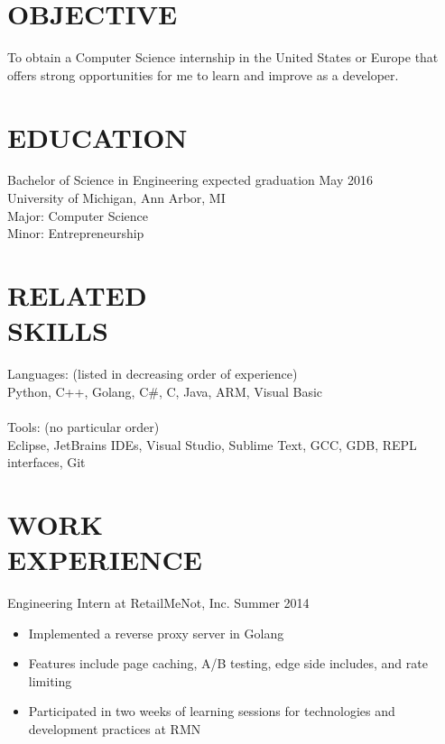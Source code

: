 \documentclass[line,margin]{res}
\begin{document}

\color{HeaderColor}
\address{ajlj@umich.edu -- 248-716-5054}
\address{Citizen of the United States and Italy}
 
 \renewcommand{\labelitemi}{$-$}
 
\begin{resume}
\color{black}
\section{\textcolor{HeaderColor}{OBJECTIVE}}
				To obtain a Computer Science internship in the United States or Europe that offers strong opportunities for me to learn and improve as a developer.

\section{\textcolor{HeaderColor}{EDUCATION}} {\sc Bachelor of Science in Engineering} \hfill expected graduation May 2016\\
				University of Michigan, Ann Arbor, MI \\
                Major: Computer Science \\
                Minor: Entrepreneurship
 
\section{\textcolor{HeaderColor}{RELATED \\ SKILLS}} 
				{\sc Languages: (listed in decreasing order of experience)} \\
				Python, C++, Golang, C\#, C, Java, ARM, Visual Basic \\ \\
                {\sc Tools: (no particular order)} \\
                Eclipse, JetBrains IDEs, Visual Studio, Sublime Text, GCC, GDB, REPL interfaces, Git
 
\section{\textcolor{HeaderColor}{WORK \\ EXPERIENCE}} 
                {\sc Engineering Intern at RetailMeNot, Inc.} \hfill Summer 2014
                 \begin{itemize}  \itemsep -2pt %
                 \item Implemented a reverse proxy server in Golang
                 \item Features include page caching, A/B testing, edge side includes, and rate limiting
                 \item Participated in two weeks of learning sessions for technologies and development practices at RMN
                 \end{itemize}


\end{resume}
\end{document}
